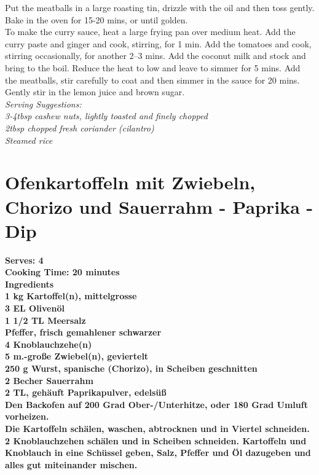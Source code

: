 \documentclass[18pt, oneside]{book}
\begin{document}
Put the meatballs in a large roasting tin, drizzle with the oil and then toss gently. Bake in the oven for 15-20 mins, or until golden.\\

To make the curry sauce, heat a large frying pan over medium heat. Add the curry paste and ginger and cook, stirring, for 1 min. Add the tomatoes and cook, stirring occasionally, for another 2--3 mins. Add the coconut milk and stock and bring to the boil. Reduce the heat to low and leave to simmer for 5 mins. Add the meatballs, stir carefully to coat and then simmer in the sauce for 20 mins. Gently stir in the lemon juice and brown sugar. \\

\it{Serving Suggestions}: \normalfont \\
3-4tbsp cashew nuts, lightly toasted and finely chopped \\
2tbsp chopped fresh coriander (cilantro) \\
Steamed rice \\

\section{Ofenkartoffeln mit Zwiebeln, Chorizo und Sauerrahm - Paprika - Dip}

\bf{Serves: 4} \\
\bf{Cooking Time: 20 minutes} \\

\bf{Ingredients} \normalfont \\
1 kg	Kartoffel(n), mittelgrosse \\
3 EL	Olivenöl \\
1 1/2 TL	Meersalz \\
Pfeffer, frisch gemahlener schwarzer \\
4 	Knoblauchzehe(n) \\
5 m.-große Zwiebel(n), geviertelt \\
250 g Wurst, spanische (Chorizo), in Scheiben geschnitten \\
2 Becher	Sauerrahm \\
2 TL, gehäuft	Paprikapulver, edelsüß \\

Den Backofen auf 200 Grad Ober-/Unterhitze, oder 180 Grad Umluft vorheizen. \\

Die Kartoffeln schälen, waschen, abtrocknen und in Viertel schneiden. 2 Knoblauchzehen schälen und in Scheiben schneiden. Kartoffeln und Knoblauch in eine Schüssel geben, Salz, Pfeffer und Öl dazugeben und alles gut miteinander mischen. \\
\end{document}
